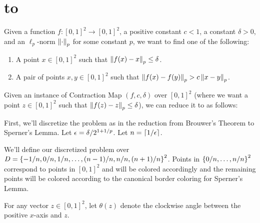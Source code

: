 \chapter{\TwoDContractionMap to \EOPL}

\begin{definition}[\TwoDContractionMap] 
  \label{def:2DContractionMap}
  Given a function $f: [0,1]^2 \to [0,1]^2$, a positive constant $c < 1$, a constant $\delta > 0$, and an $\ell_p$-norm $\left\| \cdot \right\|_p$ for some constant $p$, we want to find one of the following:
  \begin{enumerate}[label=(B\arabic*)]
  \item A point $x \in [0,1]^2$ such that $\left\| f(x) - x \right\|_p \leq \delta$. \label{B1}
  \item A pair of points $x,y \in [0,1]^2$ such that $\left\| f(x) - f(y) \right\|_p > c \left\| x - y \right\|_p$. \label{B2}
  \end{enumerate}
\end{definition}

Given an instance of Contraction Map $(f, c, \delta)$ over $[0,1]^2$ (where we want a point $z \in [0,1]^2$ such that $\left\| f(z) - z \right\|_p \leq \delta$), we can reduce it to \EOPL as follows:

First, we'll discretize the problem as in the reduction from Brouwer's Theorem to Sperner's Lemma. Let $\epsilon = \delta/2^{1+1/p}$. Let $n = \left\lceil 1/\epsilon \right\rceil$.

We'll define our discretized problem over $D = \left\{ -1/n,0/n,1/n,\dotsc,(n-1)/n,n/n,(n+1)/n \right\}^2$. Points in $\left\{ 0/n,\dotsc,n/n \right\}^2$ correspond to points in $[0,1]^2$ and will be colored accordingly and the remaining points will be colored according to the canonical border coloring for Sperner's Lemma.

For any vector $z \in [0,1]^2$, let $\theta(z)$ denote the clockwise angle between the positive $x$-axis and $z$.

